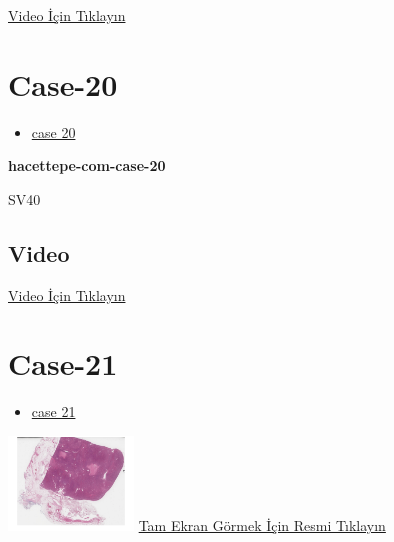 \documentclass[
  letterpaper,
  DIV=11,
  numbers=noendperiod]{scrreprt}
\providecommand{\tightlist}{%
  \setlength{\itemsep}{0pt}\setlength{\parskip}{0pt}}\usepackage{longtable,booktabs,array}
\begin{document}
\href{https://www.youtube.com/watch?v=SaNDCvKzQ6M}{Video İçin Tıklayın}

\hypertarget{sec-hacettepe-case-of-the-month-case-20}{%
\section{Case-20}\label{sec-hacettepe-case-of-the-month-case-20}}

\begin{itemize}
\tightlist
\item
  \href{https://www.youtube.com/watch?v=f8nE-6oR5VI\&ab_channel=KemalKosemehmetoglu}{case
  20}
\end{itemize}

\textbf{hacettepe-com-case-20}

\begin{tcolorbox}[enhanced jigsaw, colbacktitle=quarto-callout-tip-color!10!white, colback=white, titlerule=0mm, opacityback=0, colframe=quarto-callout-tip-color-frame, opacitybacktitle=0.6, bottomrule=.15mm, breakable, coltitle=black, title=\textcolor{quarto-callout-tip-color}{\faLightbulb}\hspace{0.5em}{Tanı}, toprule=.15mm, toptitle=1mm, bottomtitle=1mm, arc=.35mm, rightrule=.15mm, leftrule=.75mm, left=2mm]

SV40

\end{tcolorbox}

\hypertarget{video-18}{%
\subsection{Video}\label{video-18}}

\href{https://www.youtube.com/watch?v=f8nE-6oR5VI}{Video İçin Tıklayın}

\hypertarget{sec-hacettepe-case-of-the-month-case-21}{%
\section{Case-21}\label{sec-hacettepe-case-of-the-month-case-21}}

\begin{itemize}
\tightlist
\item
  \href{https://www.youtube.com/watch?v=Uith4SvB2_Q\&ab_channel=KemalKosemehmetoglu}{case
  21}
\end{itemize}

\href{https://images.patolojiatlasi.com/hacettepe-com-case-21/HE.html}{\includegraphics[width=0.25\textwidth,height=\textheight]{./screenshots/thumbnail_hacettepe-com-case-21.png}}
\href{https://images.patolojiatlasi.com/hacettepe-com-case-21/HE.html}{Tam
Ekran Görmek İçin Resmi Tıklayın}
\end{document}
